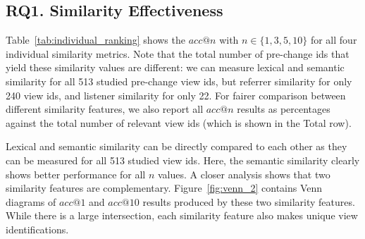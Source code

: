 \documentclass[sigconf]{acmart}
\begin{document}
\begin{table}[ht]
\caption{Accuarcy@n numbers for cascade classification models: (2) models use lexical and semantic similarities, (3) adds referrer similarity, and (4) adds listener similarity. Best results are typeset in \textbf{bold}.\label{tab:cascade}}
\end{table}

\subsection{RQ1. Similarity Effectiveness}

Table~\ref{tab:individual_ranking} shows the $acc@n$ with $n \in \{1, 3, 5,
  10\}$ for all four individual similarity metrics. Note that the total number
of pre-change ids that yield these similarity values are different: we can
measure lexical and semantic similarity for all 513 studied pre-change view
ids, but referrer similarity for only 240 view ids, and listener similarity
for only 22. For fairer comparison between different similarity features, we
also report all $acc@n$ results as percentages against the total number of
relevant view ids (which is shown in the Total row).

Lexical and semantic similarity can be directly compared to each other as they
can be measured for all 513 studied view ids. Here, the semantic similarity
clearly shows better performance for all $n$ values. A closer analysis shows
that two similarity features are complementary. Figure~\ref{fig:venn_2}
contains Venn diagrams of $acc@1$ and $acc@10$ results produced by these two
similarity features. While there is a large intersection, each similarity
feature also makes unique view identifications.
\end{document}
